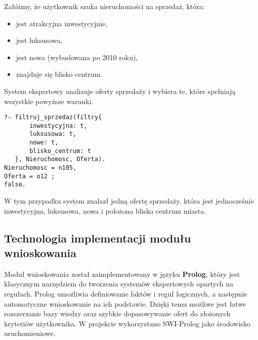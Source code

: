 Załóżmy, że użytkownik szuka nieruchomości na sprzedaż, która:
\begin{itemize}
    \item jest atrakcyjna inwestycyjnie,
    \item jest luksusowa,
    \item jest nowa (wybudowana po 2010 roku),
    \item znajduje się blisko centrum.
\end{itemize}
System ekspertowy analizuje oferty sprzedaży i wybiera te, które spełniają wszystkie powyższe warunki.

\begin{verbatim}
?- filtruj_sprzedaz(filtry{
       inwestycyjna: t,
       luksusowa: t,
       nowe: t,
       blisko_centrum: t
   }, Nieruchomosc, Oferta).
Nieruchomosc = n105,
Oferta = o12 ;
false.
\end{verbatim}

W tym przypadku system znalazł jedną ofertę sprzedaży, która jest jednocześnie inwestycyjna, luksusowa, nowa i położona blisko centrum miasta.

\subsection{Technologia implementacji modułu wnioskowania}

Moduł wnioskowania został zaimplementowany w języku \textbf{Prolog}, który jest klasycznym narzędziem do tworzenia systemów ekspertowych opartych na regułach. Prolog umożliwia definiowanie faktów i reguł logicznych, a następnie automatyczne wnioskowanie na ich podstawie. Dzięki temu możliwe jest łatwe rozszerzanie bazy wiedzy oraz szybkie dopasowywanie ofert do złożonych kryteriów użytkownika. W projekcie wykorzystano SWI-Prolog jako środowisko uruchomieniowe.
